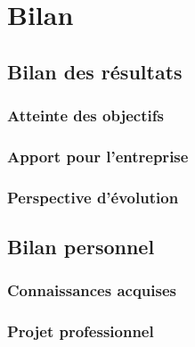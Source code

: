 \chapter{Bilan}
\lipsum[8]
\section{Bilan des résultats}
\lipsum[14]
\lipsum[5]
\lipsum[6]
\subsection{Atteinte des objectifs}
\lipsum[14]
\lipsum[5]
\subsection{Apport pour l'entreprise}
\lipsum[14]
\lipsum[5]
\subsection{Perspective d'évolution}
\lipsum[14]
\lipsum[5]

\section{Bilan personnel}
\lipsum[14]
\subsection{Connaissances acquises}
\lipsum[14]
\lipsum[5]
\subsection{Projet professionnel}
\lipsum[14]
\lipsum[5]
